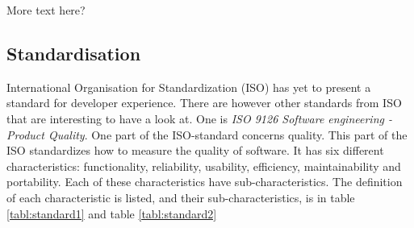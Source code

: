 \documentclass{article}
\begin{document}
More text here?


\subsection{Standardisation}
International Organisation for Standardization (ISO) has yet to present a
standard for developer experience. There are however other standards from ISO
that are interesting to have a look at. One is \textit{ISO 9126 Software engineering - Product Quality}.
One part of the ISO-standard concerns quality. This part of the ISO standardizes how to measure the quality of software.
It has six different characteristics: functionality, reliability, usability, efficiency, maintainability and
portability. Each of these characteristics have sub-characteristics. The definition of each
characteristic is listed, and their sub-characteristics, is in table \ref{tabl:standard1} and table \ref{tabl:standard2}
\end{document}
